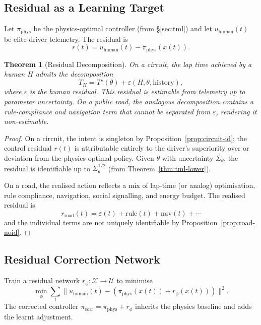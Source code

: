 \documentclass[11pt,twocolumn]{article}
\newtheorem{theorem}{Theorem}
\theoremstyle{definition}
\theoremstyle{remark}
\providecommand{\cU}{\mathcal{U}}
\providecommand{\cX}{\mathcal{X}}
\begin{document}
\subsection{Residual as a Learning Target}

Let $\pi_{\mathrm{phys}}$ be the physics-optimal controller (from \S\ref{sec:tml}) and let $u_{\mathrm{human}}(t)$ be elite-driver telemetry. The residual is
\begin{equation}
r(t) = u_{\mathrm{human}}(t) - \pi_{\mathrm{phys}}(x(t)).
\end{equation}

\begin{theorem}[Residual Decomposition]\label{thm:residual}
On a circuit, the lap time achieved by a human $H$ admits the decomposition
\begin{equation}
T_H = T^{\star}(\theta) + \varepsilon(H, \theta, \text{history}),
\end{equation}
where $\varepsilon$ is the human residual. This residual is estimable from telemetry up to parameter uncertainty. On a public road, the analogous decomposition contains a rule-compliance and navigation term that cannot be separated from $\varepsilon$, rendering it non-estimable.
\end{theorem}

\begin{proof}
On a circuit, the intent is singleton by Proposition~\ref{prop:circuit-id}; the control residual $r(t)$ is attributable entirely to the driver's superiority over or deviation from the physics-optimal policy. Given $\theta$ with uncertainty $\Sigma_\theta$, the residual is identifiable up to $\Sigma_\theta^{1/2}$ (from Theorem~\ref{thm:tml-lower}).

On a road, the realised action reflects a mix of lap-time (or analog) optimisation, rule compliance, navigation, social signalling, and energy budget. The realised residual is
\begin{equation}
r_{\mathrm{road}}(t) = \varepsilon(t) + \text{rule}(t) + \text{nav}(t) + \cdots
\end{equation}
and the individual terms are not uniquely identifiable by Proposition~\ref{prop:road-noid}.
\end{proof}

\subsection{Residual Correction Network}

Train a residual network $r_\phi: \cX \to \cU$ to minimise
\begin{equation}
\min_\phi \sum_t \|u_{\mathrm{human}}(t) - (\pi_{\mathrm{phys}}(x(t)) + r_\phi(x(t)))\|^2.
\end{equation}
The corrected controller $\pi_{\mathrm{corr}} = \pi_{\mathrm{phys}} + r_\phi$ inherits the physics baseline and adds the learnt adjustment.
\end{document}
